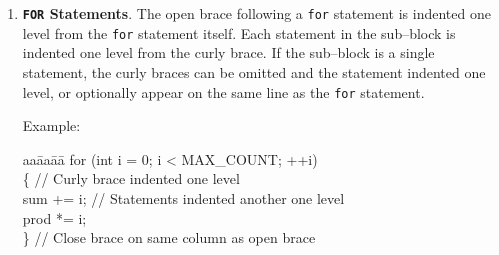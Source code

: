 \documentclass[11pt]{article}
\begin{document}
\begin{enumerate}
Examples:

\begin{tt}
\begin{tabbing}
aa\=aa\=aa\= \kill
if (someCondition) \\
\>\{ // Describe TRUE condition here\\
\>\>i = k;\\
\>\>k = i + 2;\\
\>\} // Right, curly block indented one indent level, statements one indent more
\end{tabbing}
\end{tt}

\begin{tt}
\begin{tabbing}
aa\=aa\=aa\= \kill
if (someCondition) \\
\>\{ // Describe TRUE condition here\\
\>\>i = k;\\
\>\>k = i + 2;\\
\>\} \\
else  // Right, ELSE statement on separate line, same indent as IF \\
\>\{ // Describe FALSE condition here\\
\>\>i = k * 2; \\
\>\>k = i + 4; \\
\>\}   // Right, closing curly brace lined up with open brace
\end{tabbing}
\end{tt}

\begin{tt}
\begin{tabbing}
aa\=aa\=aa\= \kill
if (someCondition) // Describe TRUE condition here\\
\>i = k; // Right, single line block need not have curly braces \\
\end{tabbing}
\end{tt}


\item {\bf {\tt FOR} Statements}.
The open brace following a {\tt for} statement is indented
one level from the {\tt for} statement itself.  Each statement
in the sub--block is indented one level from the curly brace.
If the sub--block is a single statement, the curly braces can be 
omitted and the statement indented one level, or optionally appear
on the same line as the {\tt for} statement.

Example:

\begin{tt}
\begin{tabbing}
aa\=aa\=aa\= \kill
for (int i = 0; i < MAX\_COUNT; ++i) \\
\>\{             // Curly brace indented one level \\
\>\>sum += i;    // Statements indented another one level \\
\>\>prod *= i;                                          \\
\>\}             // Close brace on same column as open brace \\
\end{tabbing}
\end{tt}


\end{enumerate}
\end{document}
